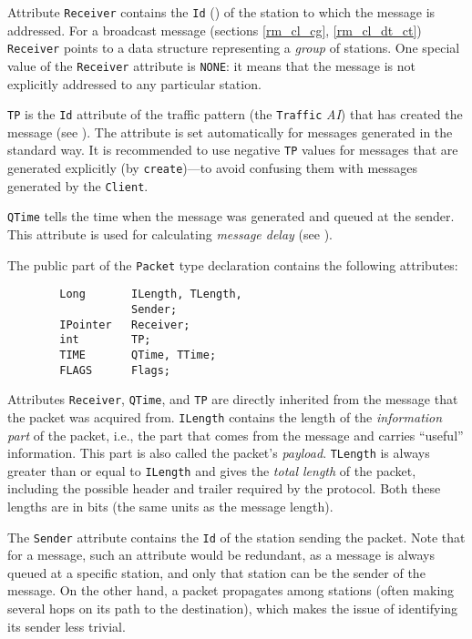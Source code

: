 Attribute {\tt Receiver} contains the {\tt Id} ()
of the station to which the message is addressed.
For a broadcast message (sections \ref{rm_cl_cg}, \ref{rm_cl_dt_ct})
{\tt Receiver} points to a data
structure representing a {\em group\/} of stations.
One special value of the {\tt Receiver} attribute is {\tt NONE}: it means that
the message is not explicitly addressed to any particular station.

{\tt TP} is the {\tt Id} attribute of the traffic pattern (the {\tt Traffic}
{\em AI\/}) that has created the message (see ).
The attribute is set automatically for messages generated in the standard way.
It is recommended to use negative {\tt TP}
values for messages that are generated
explicitly (by {\tt create})---to avoid confusing them with messages
generated by the {\tt Client}.

{\tt QTime} tells the time when the message was generated and
queued at the sender.
This attribute is used for calculating {\em message delay\/}
(see ).

The public part of the {\tt Packet} type declaration contains the following
attributes:
\begin{verbatim}
        Long       ILength, TLength,
                   Sender;
        IPointer   Receiver;
        int        TP;
        TIME       QTime, TTime;
        FLAGS      Flags;
\end{verbatim}

Attributes {\tt Receiver}, {\tt QTime}, and {\tt TP} are directly inherited
from the message that the packet was acquired from.
{\tt ILength} contains the length of the {\em information part\/} of the
packet, i.e., the part that comes from the message and carries ``useful''
information.
This part is also called the packet's {\em payload}.
{\tt TLength} is always greater than or equal to {\tt ILength} and
gives the {\em total length\/} of the packet, including the possible header and
trailer required by the protocol.
Both these lengths are in bits (the same units as the message length).

The {\tt Sender} attribute contains the {\tt Id} of the station sending the
packet.
Note that for a message, such an attribute would be redundant, as a message is
always queued at a specific station, and only that station can be the sender
of the message.
On the other hand, a packet propagates among stations (often
making several hops on its path to the destination), which makes the
issue of identifying its sender less trivial.

